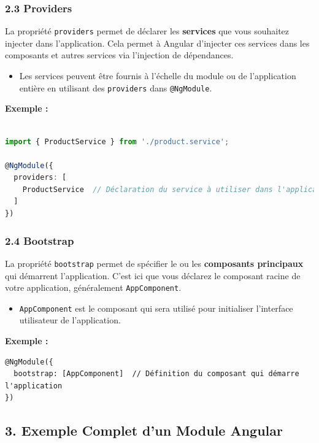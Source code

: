 \documentclass{article}
\begin{document}
\subsubsection*{2.3 Providers}
La propriété \texttt{providers} permet de déclarer les \textbf{services} que vous souhaitez injecter dans l'application. Cela permet à Angular d’injecter ces services dans les composants et autres services via l’injection de dépendances.

\begin{itemize}
    \item Les services peuvent être fournis à l’échelle du module ou de l’application entière en utilisant des \texttt{providers} dans \texttt{@NgModule}.
\end{itemize}

\textbf{Exemple :}  
\begin{lstlisting}[language=TypeScript, caption={Using a service in a component}, label={lst:typescript-service-usage}]

import { ProductService } from './product.service';

@NgModule({
  providers: [
    ProductService  // Déclaration du service à utiliser dans l'application
  ]
})
\end{lstlisting}

\subsubsection*{2.4 Bootstrap}
La propriété \texttt{bootstrap} permet de spécifier le ou les \textbf{composants principaux} qui démarrent l'application. C’est ici que vous déclarez le composant racine de votre application, généralement \texttt{AppComponent}.

\begin{itemize}
    \item \texttt{AppComponent} est le composant qui sera utilisé pour initialiser l’interface utilisateur de l'application.
\end{itemize}

\textbf{Exemple :}  
\begin{verbatim}
@NgModule({
  bootstrap: [AppComponent]  // Définition du composant qui démarre l'application
})
\end{verbatim}

\subsection*{3. Exemple Complet d’un Module Angular}
\end{document}
